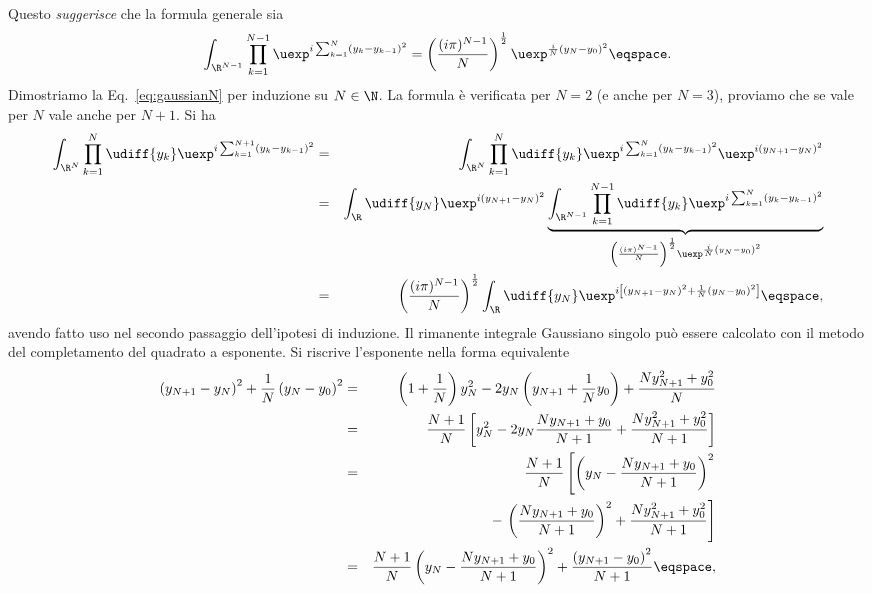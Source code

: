 Questo \emph{suggerisce} che la formula generale sia
\begin{equation}\label{eq:gaussianN}
\int_{\R^{N-1}} \prod_{k=1}^{N-1} \uexp^{ i \sum_{k=1}^{N} \left( y_{k} -
y_{k-1} \right)^{2}} = \left( \frac{(i\pi)^{N-1}}{N} \right)^{\frac{1}{2}}
\uexp^{ \frac{i}{N} \left( y_{N} - y_{0} \right)^{2}} \eqspace .
\end{equation}
Dimostriamo la Eq.~\eqref{eq:gaussianN} per induzione su $N\in\N$. La formula \`e verificata per $N=2$ (e anche
per $N=3$), proviamo che se vale per $N$ vale anche per $N+1$. 
Si ha
\begin{eqnarray*}
\int_{\R^{N}} \prod_{k=1}^{N} \udiff{y_{k}} \uexp^{ i \sum_{k=1}^{N+1} \left(
y_{k} - y_{k-1}\right)^{2}} &=&
\int_{\R^{N}} \prod_{k=1}^{N} \udiff{y_{k}} \uexp^{i \sum_{k=1}^{N} \left( y_{k}
- y_{k-1} \right)^{2}} \uexp^{ i \left( y_{N+1} - y_{N} \right)^{2} } \\
&=& \int_{\R} \udiff{y_{N}} \uexp^{ i \left( y_{N+1} - y_{N} \right)^{2}}
\underbrace{%
\int_{\R^{N-1}} \prod_{k=1}^{N-1} \udiff{y_{k}} \uexp^{i \sum_{k=1}^{N} \left(
y_{k} - y_{k-1} \right)^{2}}}_{%
\left( \frac{(i\pi)^{N-1}}{N} \right)^{\frac{1}{2}} \uexp^{ \frac{i}{N} \left(
y_{N} - y_{0}\right)^{2}}} \\
&=& \left( \frac{(i\pi)^{N-1}}{N} \right)^{\frac{1}{2}} 
\int_{\R} \udiff{y_{N}}
\uexp^{ i \left[ \left( y_{N+1} - y_{N} \right)^{2} + \frac{1}{N} \left( y_{N} -
y_{0} \right)^{2} \right] } \eqspace ,
\end{eqnarray*}
avendo fatto uso nel secondo passaggio dell'ipotesi di induzione. Il rimanente
integrale Gaussiano singolo pu\`o essere calcolato con il metodo del
completamento del quadrato a esponente. Si riscrive l'esponente nella forma
equivalente
\begin{eqnarray*}
\left( y_{N+1} - y_{N} \right)^{2} + \frac{1}{N} \left( y_{N} - y_{0}
\right)^{2} &=&
\left( 1 + \frac{1}{N} \right) y_{N}^{2} -  2y_{N} \left( y_{N+1} + \frac{1}{N}
y_{0} \right) + \frac{N y_{N+1}^{2} + y_{0}^{2}}{N} \\
&=& \frac{N+1}{N} \left[ y_{N}^{2} - 2 y_{N} \frac{ N y_{N+1} + y_{0}}{N+1}
 + \frac{N y_{N+1}^{2} + y_{0}^{2}}{N+1} \right] \\
&=& \frac{N+1}{N} \left[ \left( y_{N} - \frac{N y_{N+1} + y_{0}}{N+1}
\right)^{2} \right.\\
&&{} -\left. \left( \frac{Ny_{N+1} + y_{0} }{N+1} \right)^{2} +
\frac{Ny_{N+1}^{2} + y_{0}^{2}}{N+1} \right] \\
&=& \frac{N+1} {N} \left( y_{N} - \frac{Ny_{N+1} + y_{0}}{N+1} \right)^{2} + 
\frac{\left( y_{N+1}-y_{0}\right)^{2}}{N+1} \eqspace ,
\end{eqnarray*}
